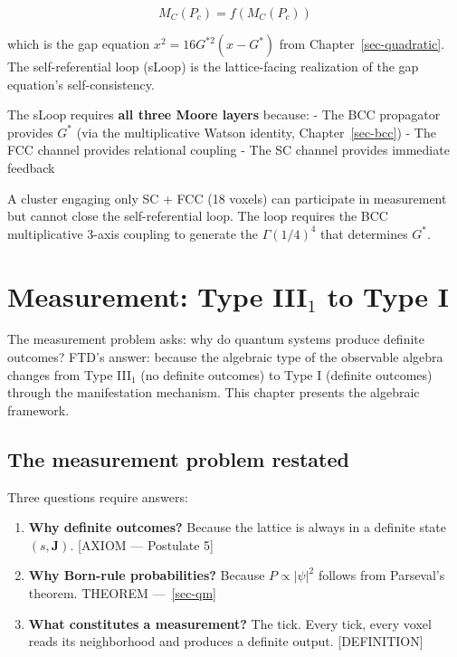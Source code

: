 \documentclass[
  11pt,
  letterpaper,
  twoside,
  openany]{book}
\makeatletter
\providecommand{\tightlist}{%
  \setlength{\itemsep}{0pt}\setlength{\parskip}{0pt}}
\let\orig@section\section
\renewcommand{\section}{\needspace{8\baselineskip}\orig@section}
\newcommand{\Gs}{G^{*}{}}
\newcommand{\Gssq}{G^{*2}{}}      %
\makeatother
\begin{document}
\[
M_C(P_c) = f(M_C(P_c))
\]

which is the gap equation \(x^2 = 16\Gssq(x - \Gs)\) from
Chapter~\ref{sec-quadratic}. The self-referential loop (sLoop) is the
lattice-facing realization of the gap equation's self-consistency.

The sLoop requires \textbf{all three Moore layers} because: - The BCC
propagator provides \(\Gs\) (via the multiplicative Watson identity,
Chapter~\ref{sec-bcc}) - The FCC channel provides relational coupling -
The SC channel provides immediate feedback

A cluster engaging only SC + FCC (18 voxels) can participate in
measurement but cannot close the self-referential loop. The loop
requires the BCC multiplicative 3-axis coupling to generate the
\(\Gamma(1/4)^4\) that determines \(\Gs\).

\chapter{\texorpdfstring{Measurement: Type III\(_1\) to Type
I}{Measurement: Type III\_1 to Type I}}\label{sec-measurement}

The measurement problem asks: why do quantum systems produce definite
outcomes? FTD's answer: because the algebraic type of the observable
algebra changes from Type III\(_1\) (no definite outcomes) to Type I
(definite outcomes) through the manifestation mechanism. This chapter
presents the algebraic framework.

\section{The measurement problem
restated}\label{the-measurement-problem-restated}

Three questions require answers:

\begin{enumerate}
\def\labelenumi{\arabic{enumi}.}
\tightlist
\item
  \textbf{Why definite outcomes?} Because the lattice is always in a
  definite state \((s, \mathbf{J})\). {[}AXIOM --- Postulate 5{]}
\item
  \textbf{Why Born-rule probabilities?} Because \(P \propto |\psi|^2\)
  follows from Parseval's theorem. THEOREM ---~\ref{sec-qm}
\item
  \textbf{What constitutes a measurement?} The tick. Every tick, every
  voxel reads its neighborhood and produces a definite output.
  {[}DEFINITION{]}
\end{enumerate}
\end{document}
